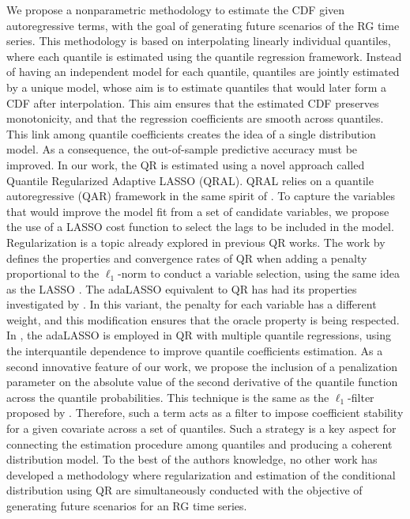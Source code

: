 We propose a nonparametric methodology to estimate the CDF given autoregressive terms, with the goal of generating future scenarios of the RG time series. This methodology is based on interpolating linearly individual quantiles, where each quantile is estimated using the quantile regression framework.
Instead of having an independent model for each quantile, quantiles are jointly estimated by a unique model, whose aim is to estimate quantiles that would later form a CDF after interpolation. This aim ensures that the estimated CDF preserves monotonicity, and that the regression coefficients are smooth across quantiles. This link among quantile coefficients creates the idea of a single distribution model. As a consequence, the out-of-sample predictive accuracy must be improved.
In our work, the QR is estimated using a novel approach called Quantile Regularized Adaptive LASSO (QRAL).
QRAL relies on a quantile autoregressive (QAR) framework in the same spirit of \cite{koenker1978regression,koenker_quantile_2006,koenker2005quantile}. To capture the variables that would improve the model fit from a set of candidate variables, we propose the use of a LASSO cost function to select the lags to be included in the model. Regularization is a topic already explored in previous QR works. The work by \cite{belloni_l1-penalized_2009} defines the properties and convergence rates of QR when adding a penalty proportional to the $\ell_1$-norm to conduct a variable selection, using the same idea as the LASSO \cite{tibshirani1996regression}. The adaLASSO equivalent to QR has had its properties investigated by \cite{ciuperca_adaptive_2016}. In this variant, the penalty for each variable has a different weight, and this modification ensures that the oracle property is being respected. %
In \cite{zou_regularized_2008,jiang_interquantile_2014}, the adaLASSO is employed in QR with multiple quantile regressions, using the interquantile dependence to improve  quantile coefficients estimation.
As a second innovative feature of our work, we propose the inclusion of a penalization parameter on the absolute value of the second derivative of the quantile function across the quantile probabilities. 
This technique is the same as the $\ell_1$-filter proposed by \cite{boyd2011distributed}. 
Therefore, such a term acts as a filter to impose coefficient stability for a given covariate across a set of quantiles. Such a strategy is a key aspect for connecting the estimation procedure among quantiles and producing a coherent distribution model.
To the best of the authors knowledge, no other work has developed a methodology where regularization and estimation of the conditional distribution using QR are simultaneously conducted with the objective of generating future scenarios for an RG time series.


